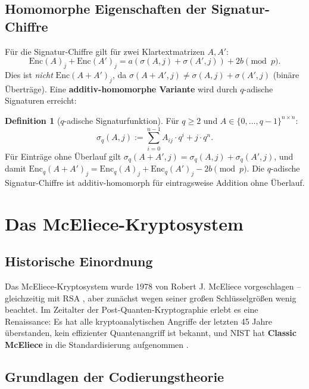﻿\documentclass[a4paper,12pt]{scrreprt}
\theoremstyle{definition}
\newtheorem{definition}{Definition}[section]
\begin{document}
\subsection{Homomorphe Eigenschaften der Signatur-Chiffre}

Für die Signatur-Chiffre gilt für zwei Klartextmatrizen $A, A'$:
\[
\mathrm{Enc}(A)_j + \mathrm{Enc}(A')_j = a(\sigma(A,j) + \sigma(A',j)) + 2b \pmod{p}.
\]
Dies ist \emph{nicht} $\mathrm{Enc}(A+A')_j$, da $\sigma(A+A',j) \neq \sigma(A,j)+\sigma(A',j)$ (binäre Überträge). Eine \textbf{additiv-homomorphe Variante} wird durch $q$-adische Signaturen erreicht:

\begin{definition}[$q$-adische Signaturfunktion]\label{def:qadic}
Für $q \geq 2$ und $A \in \{0,\ldots,q-1\}^{n \times n}$:
\[
\sigma_q(A, j) := \sum_{i=0}^{n-1} A_{ij} \cdot q^i + j \cdot q^n.
\]
Für Einträge ohne Überlauf gilt $\sigma_q(A+A',j) = \sigma_q(A,j) + \sigma_q(A',j)$, und damit $\mathrm{Enc}_q(A+A')_j = \mathrm{Enc}_q(A)_j + \mathrm{Enc}_q(A')_j - 2b \pmod p$. Die $q$-adische Signatur-Chiffre ist additiv-homomorph für eintragsweise Addition ohne Überlauf.
\end{definition}

\section{Das McEliece-Kryptosystem}

\subsection{Historische Einordnung}

Das McEliece-Kryptosystem wurde 1978 von Robert J. McEliece \cite{McE78} vorgeschlagen -- gleichzeitig mit RSA \cite{Riv78}, aber zunächst wegen seiner großen Schlüsselgrößen wenig beachtet. Im Zeitalter der Post-Quanten-Kryptographie erlebt es eine Renaissance: Es hat alle kryptoanalytischen Angriffe der letzten 45 Jahre überstanden, kein effizienter Quantenangriff ist bekannt, und NIST hat \textbf{Classic McEliece} in die Standardisierung aufgenommen \cite{NIST22}.

\subsection{Grundlagen der Codierungstheorie}
\end{document}
